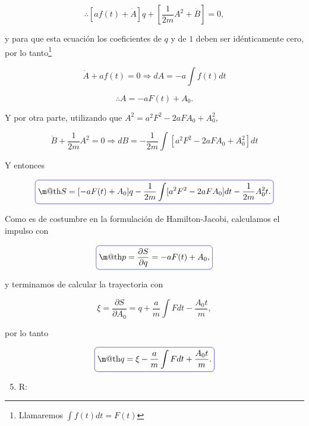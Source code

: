 \documentclass[a4paper,10pt]{article}
\makeatletter
\numberwithin{equation}{section}
\newcommand*{\boxcolor}{blue}
\renewcommand{\boxed}[1]{\textcolor{\boxcolor}{%
\tikz[baseline={([yshift=-1ex]current bounding box.center)}] \node [rectangle, minimum width=1ex,rounded corners,draw] {\normalcolor\m@th$\displaystyle#1$};}}
\makeatother
\begin{document}
\begin{equation}
 \therefore [af(t) + \dot{A}]q + \left[\frac{1}{2m}A^2 + \dot{B} \right] = 0,
\end{equation}

y para que esta ecuación los coeficientes de $q$ y de $1$ deben ser idénticamente 
cero, por lo tanto\footnote{Llamaremos $\int f(t) dt = F(t)$}

\begin{equation}
 \dot{A} + af(t) = 0 \Rightarrow dA = - a\int f(t)dt
\end{equation}

\begin{equation}
 \therefore A = -aF(t) + A_0.
\end{equation}

Y por otra parte, utilizando que $A^2 = a^2F^2 - 2aFA_0 + A_0^2$, 

\begin{equation}
 \dot{B} + \frac{1}{2m}A^2 = 0 \Rightarrow dB = 
 - \frac{1}{2m} \int [a^2F^2 - 2aFA_0 + A_0^2] dt
\end{equation}

Y entonces 

\begin{equation}
 \boxed{S = [-aF(t) + A_0]q  - \frac{1}{2m} \int [a^2F^2 - 2aFA_0] dt - \frac{1}{2m}A_0^2t.}
\end{equation}

Como es de costumbre en la formulación de Hamilton-Jacobi, calculamos el impulso 
con 

\begin{equation}
 \boxed{p = \frac{\partial S}{\partial q} = -aF(t) + A_0,}
\end{equation}

y terminamos de calcular la trayectoria con 

\begin{equation}
 \xi = \frac{\partial S}{\partial A_0} = q + \frac{a}{m}\int F dt - \frac{A_0t}{m},
\end{equation}

por lo tanto 

\begin{equation}
 \boxed{q = \xi - \frac{a}{m}\int F dt + \frac{A_0t}{m}.}
\end{equation}

\begin{enumerate}[label=\alph*)]
\setcounter{enumi}{4}
 \item R:
\end{enumerate}
\end{document}
